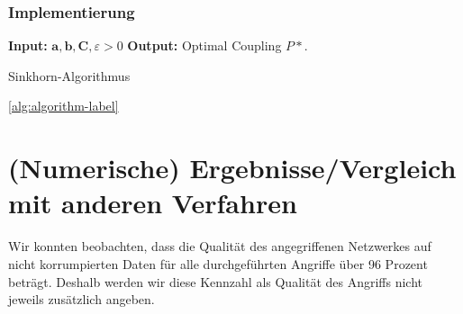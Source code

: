 \documentclass[11pt,a4paper]{article}
\numberwithin{equation}{section}
\begin{document}
	
	\subsubsection{Implementierung}
	\begin{algorithm}
		\hspace*{\algorithmicindent} \textbf{Input: } $\boldsymbol{a}, \boldsymbol{b}, \boldsymbol{C}, \varepsilon > 0$		\newline
		\hspace*{\algorithmicindent} \textbf{Output: } Optimal Coupling $P*$. 
		
		\caption{Sinkhorn-Algorithmus}
		\label{alg:sinkhorn}
		\begin{algorithmic}
			\REPEAT
		\end{algorithmic}	
	\end{algorithm}
	
	
	\ref*{alg:algorithm-label}
	
	\section{(Numerische) Ergebnisse/Vergleich mit anderen Verfahren} \label{chapter_comparisons}
	
	Wir konnten beobachten, dass die Qualität des angegriffenen Netzwerkes auf nicht korrumpierten Daten für alle durchgeführten Angriffe über 96 Prozent beträgt. Deshalb werden wir diese Kennzahl als Qualität des Angriffs nicht jeweils zusätzlich angeben.
	
\end{document}
